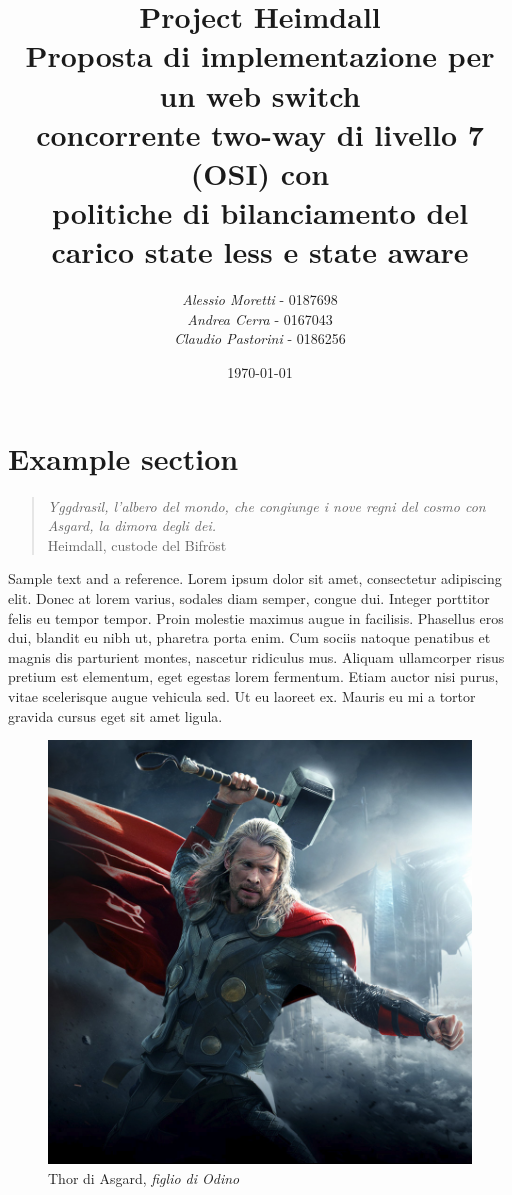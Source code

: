 \documentclass[italian]{tktltiki2}
\title{%
    \huge Project Heimdall 
    \\
    \large Proposta di implementazione per un web switch 
    \\
    concorrente two-way di livello 7 (OSI) con
    \\
    politiche di bilanciamento del carico state less e state aware
  }
\author{\emph{Alessio Moretti} - 0187698
    \\
    \emph{Andrea Cerra} - 0167043
    \\
    \emph{Claudio Pastorini} - 0186256}
\date{\today}
\begin{document}
\maketitle        %

\tableofcontents  %

\mainmatter       %

\section{Example section}
\begin{quote}
\flushright
	\emph{Yggdrasil, l'albero del mondo, che congiunge i nove regni del cosmo con Asgard, la dimora degli dei.}
  \\
  Heimdall, custode del Bifröst
\end{quote}

Sample text and a reference\cite{lamport94}. Lorem ipsum dolor sit amet, consectetur adipiscing elit. Donec at lorem varius, sodales diam semper, congue dui. Integer porttitor felis eu tempor tempor. Proin molestie maximus augue in facilisis. Phasellus eros dui, blandit eu nibh ut, pharetra porta enim. Cum sociis natoque penatibus et magnis dis parturient montes, nascetur ridiculus mus. Aliquam ullamcorper risus pretium est elementum, eget egestas lorem fermentum. Etiam auctor nisi purus, vitae scelerisque augue vehicula sed. Ut eu laoreet ex. Mauris eu mi a tortor gravida cursus eget sit amet ligula.

\begin{figure}
\centering
\includegraphics[width=\textwidth]{images/thor}
\caption{Thor di Asgard, \emph{figlio di Odino}}
\end{figure}
\end{document}
